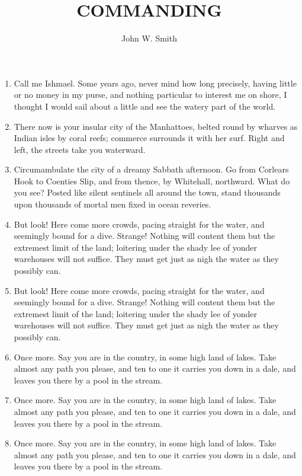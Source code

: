 \documentclass{../armymemo}
\author{John W. Smith}\rank{CPT}\branch{CY}
\title{COMMANDING}
\begin{document}
\begin{enumerate}
	\item Call me Ishmael. Some years ago, never mind how long precisely, having
	      little or no money in my purse, and nothing particular to interest me on shore,
	      I thought I would sail about a little and see the watery part of the world.
	\item There now is your insular city of the Manhattoes, belted round by wharves
	      as Indian isles by coral reefs; commerce surrounds it with her surf. Right and
	      left, the streets take you waterward.
	\item Circumambulate the city of a dreamy Sabbath afternoon. Go from Corlears
	      Hook to Coenties Slip, and from thence, by Whitehall, northward. What do you
	      see? Posted like silent sentinels all around the town, stand thousands upon
	      thousands of mortal men fixed in ocean reveries.
	\item But look! Here come more crowds, pacing straight for the water, and
	      seemingly bound for a dive. Strange! Nothing will content them but the extremest
	      limit of the land; loitering under the shady lee of yonder warehouses will not
	      suffice. They must get just as nigh the water as they possibly can.
	\item But look! Here come more crowds, pacing straight for the water, and
	      seemingly bound for a dive. Strange! Nothing will content them but the extremest
	      limit of the land; loitering under the shady lee of yonder warehouses will not
	      suffice. They must get just as nigh the water as they possibly can.
	\item Once more. Say you are in the country, in some high land of lakes. Take
	      almost any path you please, and ten to one it carries you down in a dale, and
	      leaves you there by a pool in the stream.
	\item Once more. Say you are in the country, in some high land of lakes. Take
	      almost any path you please, and ten to one it carries you down in a dale, and
	      leaves you there by a pool in the stream.
	\item Once more. Say you are in the country, in some high land of lakes. Take
	      almost any path you please, and ten to one it carries you down in a dale, and
	      leaves you there by a pool in the stream.
\end{enumerate}
\end{document}
